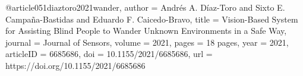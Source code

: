 @article{051diaztoro2021wander,
author    = {Andr\'{e}s A. D\'{i}az-Toro and Sixto E. Campa\~{n}a-Bastidas and Eduardo F. Caicedo-Bravo},
title     = {Vision-Based System for Assisting Blind People to Wander Unknown Environments in a Safe Way},
journal   = {Journal of Sensors},
volume    = {2021},
pages     = {18 pages},
year      = {2021},
articleID = {6685686},
doi       = {10.1155/2021/6685686},
url       = {https://doi.org/10.1155/2021/6685686}
}